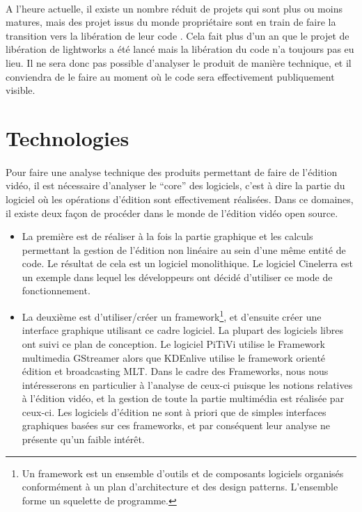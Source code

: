 \paragraph{}
A l'heure actuelle, il existe un nombre réduit de projets qui
sont plus ou moins matures, mais des projet issus du monde propriétaire
sont en train de faire la transition vers la libération de leur code
\cite{TheLightworksOpenSourceProjectStartHere}. Cela fait plus d'un an que
le projet de libération de lightworks a été lancé mais la libération
du code n'a toujours pas eu lieu. Il ne sera donc pas possible d'analyser
le produit de manière technique, et il conviendra de le faire au moment
où le code sera effectivement publiquement visible.

\section{Technologies} \paragraph{} Pour faire une analyse technique
des produits permettant de faire de l'édition vidéo, il est nécessaire
d'analyser le ``core'' des logiciels, c'est à dire la partie du
logiciel où les opérations d'édition sont effectivement réalisées. Dans
ce domaines, il existe deux façon de procéder dans le monde de l'édition
vidéo open source.

\begin{itemize}
  \item{La première est de réaliser à la fois la partie graphique et
    les calculs permettant la gestion de l'édition non linéaire au
    sein d'une même entité de code. Le résultat de cela est un logiciel
    monolithique. Le logiciel Cinelerra est un %
    exemple dans lequel les développeurs ont décidé d'utiliser ce
    mode de fonctionnement.}
  \item{La deuxième est d'utiliser/créer un framework\footnote{Un
    framework est un ensemble d'outils et de composants logiciels
    organisés conformément à un plan d'architecture et des design
    patterns. L'ensemble forme un squelette de programme.}, et d'ensuite
    créer une interface graphique utilisant ce cadre logiciel. La
    plupart des logiciels libres ont suivi ce plan de conception. Le
    logiciel PiTiVi utilise le Framework multimedia GStreamer alors que
    KDEnlive utilise le framework orienté édition et broadcasting
    MLT. Dans le cadre des Frameworks, nous nous intéresserons en
    particulier à l'analyse de ceux-ci puisque les notions relatives à
    l'édition vidéo, et la gestion de toute la partie multimédia est
    réalisée par ceux-ci. Les logiciels d'édition ne sont à priori
    que de simples interfaces graphiques basées sur ces frameworks,
    et par conséquent leur analyse ne présente qu'un faible intérêt.}
\end{itemize}

